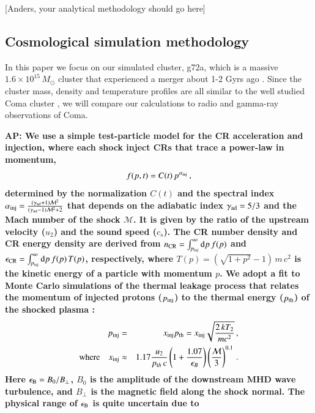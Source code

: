 \documentclass[a4paper,fleqn,usenatbib]{mnras}
\newcommand{\dd}{\mathrm{d}}
\newcommand\eb{\epsilon_\rmn{B}}
\def\AP#1{{\bf  AP: #1}}
\begin{document}
[Anders, your analytical methodology should go here]


\subsection{Cosmological simulation methodology}

In this
paper we focus on our simulated cluster, g72a, which is a massive
$1.6\times10^{15}\,M_\odot$ cluster that experienced a merger about
1-2 Gyrs ago \citep{2009MNRAS.399..497D}. Since the cluster mass,
density and temperature profiles are all similar to the well studied
Coma cluster \citep{2007MNRAS.378..385P,pinzke10}, we will compare our
calculations to radio and gamma-ray observations of Coma.

\AP{We use a simple test-particle model for the CR acceleration and
  injection, where each shock inject CRs that trace a power-law in
  momentum,
  \begin{equation}
    f(p,t) = C(t)\,p^{\alpha_{\mathrm{inj}}}\,,
  \end{equation}
  determined by the normalization $C(t)$ and the spectral index
  $\alpha_{\mathrm{inj}}=\frac{(\gamma_{\mathrm{ad}}+1)\mathcal{M}^2}{(\gamma_{\mathrm{ad}}-1)\mathcal{M}^2+2}$
  that depends on the adiabatic index $\gamma_{\mathrm{ad}} = 5/3$ and the
  Mach number of the shock $\mathcal{M}$. It is given by the ratio of
  the upstream velocity ($u_2$) and the sound speed ($c_s$). The CR
  number density and CR energy density are derived from $n_\rmn{CR} =
  \int_{p_\rmn{inj}}^\infty \dd p\, f(p)$ and $\epsilon_\rmn{CR} =
  \int_{p_\rmn{inj}}^\infty \dd p\, f(p) \,T(p)$, respectively, where
  $T(p) = (\sqrt{1+p^2} -1)\, m\,c^2$ is the kinetic energy of a
  particle with momentum $p$. We adopt a fit to Monte Carlo
  simulations of the thermal leakage process that relates the momentum
  of injected protons ($p_{\mathrm{inj}}$) to the thermal energy
  ($p_{\mathrm{th}}$) of the shocked plasma \citep{kang11}:
  \begin{eqnarray}
  \label{eq:qinj}
  p_{\mathrm{inj}} &=& x_{\mathrm{inj}} p_{\mathrm{th}} = x_{\mathrm{inj}} \sqrt{\frac{2 \,k T_2}{m c^2}}\,, \nonumber \\
  {\mathrm{where}}\quad x_{\mathrm{inj}} &\approx& 1.17 \frac{u_2}{p_{{\mathrm{t}}h}\,c} \left(1+
  \frac{1.07}{\epsilon_B}\right) \left(\frac{\mathcal{M}}{3}\right)^{0.1}\,.
  \end{eqnarray}
Here $\eb = B_0/B_{\perp}$, $B_0$ is the amplitude of the downstream
MHD wave turbulence, and $B_{\perp}$ is the magnetic field along the
shock normal. The physical range of $\eb$ is quite uncertain due to
}
\end{document}
